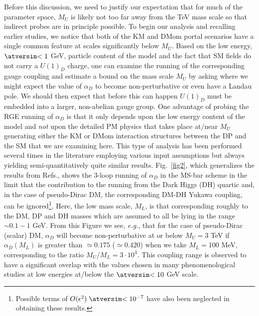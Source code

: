 \documentclass[14pt]{article}
\def\eg{{\it e.g.}}
\def\matth{\mathsurround=0pt}
\def\lsim{\mathrel{\mathpalette\atversim<}}
\def\atversim#1#2{\lower0.7ex\vbox{\baselineskip\zatskip\lineskip\zatskip
  \lineskiplimit 0pt\ialign{$\matth#1\hfil##\hfil$\crcr#2\crcr\sim\crcr}}}
\begin{document}
Before this discussion, we need to justify our expectation that for much of the parameter space, $M_U$ is likely not too far away from the TeV mass scale so that indirect probes are in principle 
possible. To begin our analysis and recalling earlier studies\cite{Davoudiasl:2015hxa,Reilly:2023frg,Rizzo:2022qan,Rizzo:2022lpm}, we notice that both of the KM and DMom portal scenarios 
have a single common feature at scales significantly below 
$M_U$.  Based on the low energy, $\lsim 1$ GeV, particle content of the model and the fact that SM fields do not carry a $U(1)_D$ charge, one can examine the running of the corresponding 
gauge coupling and estimate a bound on the mass scale $M_U$ by asking where we might expect the value of $\alpha_D$ to become non-perturbative or even have 
a Landau pole. We should then expect that 
before this can happen $U(1)_D$ must be embedded into a larger, non-abelian gauge group.  One advantage of probing the RGE running of $\alpha_D$ is that it only depends upon the low 
energy content of the model 
and {\it not} upon the detailed PM physics that takes place at/near $M_U$ generating either the KM or DMom interaction structures between the DP and the SM that we are examining here. 
This type of analysis has been performed several times in the literature employing various input assumptions but always yielding semi-quantitatively quite 
similar results\cite{Davoudiasl:2015hxa,Reilly:2023frg,Rizzo:2022qan,Rizzo:2022lpm}. Fig.~\ref{fig2}, which generalizes the results from Refs.\cite{Rizzo:2022qan,Rizzo:2022lpm}, shows the 
3-loop running of $\alpha_D$ in the MS-bar scheme in the limit that the contribution to the running from the Dark Higgs (DH) quartic and, in the case of pseudo-Dirac DM, the corresponding 
DM-DH Yukawa coupling, can be ignored{\footnote {Possible terms of $O(\epsilon^2)\lsim 10^{-7}$ have also been neglected in obtaining these results.}}. 
Here, the low mass scale, $M_L$, is that corresponding roughly to the DM, DP and DH masses which are assumed to all be lying in the range 
$\sim 0.1-1$ GeV. From this Figure we see, \eg, that for the case of pseudo-Dirac (scalar) DM, $\alpha_D$ will become non-perturbative at or below $M_U=3$ TeV if $\alpha_D(M_L)$ is greater 
than  $\simeq 0.175$ ($\simeq 0.420$) when we take $M_L=100$ MeV, corresponding to the ratio $M_U/M_L=3\cdot 10^4$. This coupling range is observed to have a significant overlap with 
the values chosen in many phenomenological studies at low energies at/below the $\lsim 10$ GeV scale\cite{Alexander:2016aln,Battaglieri:2017aum,Bertone:2018krk,Cooley:2022ufh,Boveia:2022syt,Schuster:2021mlr}.
\end{document}
